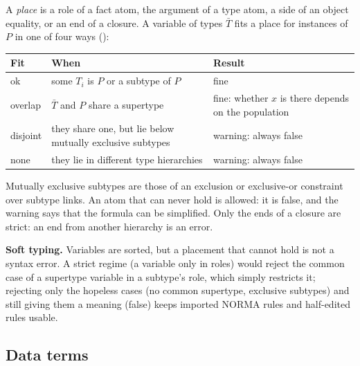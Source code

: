 \documentclass[11pt, a4paper]{article}
\begin{document}
A \emph{place} is a role of a fact atom, the argument of a type atom, a side
of an object equality, or an end of a closure. A variable of types $\bar T$
fits a place for instances of $P$ in one of four ways ():
\begin{center}
\small
\begin{tabularx}{\textwidth}{l X X}
\toprule
\textbf{Fit} & \textbf{When} & \textbf{Result} \\
\midrule
ok & some $T_i$ is $P$ or a subtype of $P$ & fine \\
overlap & $\bar T$ and $P$ share a supertype & fine: whether $x$ is there depends on the population \\
disjoint & they share one, but lie below mutually exclusive subtypes & warning: always false \\
none & they lie in different type hierarchies & warning: always false \\
\bottomrule
\end{tabularx}
\end{center}
Mutually exclusive subtypes are those of an exclusion or exclusive-or
constraint over subtype links. An atom that can never hold is allowed: it
is false, and the warning says that the formula can be simplified. Only the
ends of a closure are strict: an end from another hierarchy is an error.

\begin{rationale}
\textbf{Soft typing.} Variables are sorted, but a placement that cannot
hold is not a syntax error. A strict regime (a  variable only
in  roles) would reject the common case of a supertype variable
in a subtype's role, which simply restricts it; rejecting only the
hopeless cases (no common supertype, exclusive subtypes) and still giving
them a meaning (false) keeps imported NORMA rules and half-edited rules
usable.
\end{rationale}

\subsection{Data terms}
\end{document}
